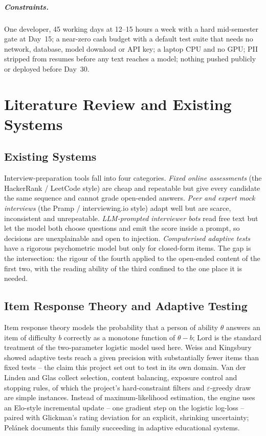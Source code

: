 \documentclass{tietreport}
\begin{document}
\paragraph{Constraints.} One developer, 45 working days at 12--15 hours a week with a hard
mid-semester gate at Day~15; a near-zero cash budget with a default test suite that needs no
network, database, model download or API key; a laptop CPU and no GPU; PII stripped from
resumes before any text reaches a model; nothing pushed publicly or deployed before Day~30.

\chapter{Literature Review and Existing Systems}
\label{ch:literature}

\section{Existing Systems}

Interview-preparation tools fall into four categories. \emph{Fixed online assessments} (the HackerRank / LeetCode style) are cheap and repeatable but give every candidate the same sequence and cannot grade open-ended answers. \emph{Peer and expert mock interviews} (the Pramp / interviewing.io style) adapt well but are scarce, inconsistent and unrepeatable. \emph{LLM-prompted interviewer bots} read free text but let the model both choose questions and emit the score inside a prompt, so decisions are unexplainable and open to injection. \emph{Computerised adaptive tests} have a rigorous psychometric model \cite{vanderlinden2000cat} but only for closed-form items. The gap is the intersection: the rigour of the fourth applied to the open-ended content of the first two, with the reading ability of the third confined to the one place it is needed.

\section{Item Response Theory and Adaptive Testing}

Item response theory models the probability that a person of ability $\theta$ answers an item
of difficulty $b$ correctly as a monotone function of $\theta-b$; Lord \cite{lord1980irt} is the
standard treatment of the two-parameter logistic model used here. Weiss and Kingsbury
\cite{weiss1984cat} showed adaptive tests reach a given precision with substantially fewer items
than fixed tests -- the claim this project set out to test in its own domain. Van der Linden and Glas \cite{vanderlinden2000cat} collect selection, content balancing, exposure control and stopping rules, of which the project's hard-constraint filters and $\varepsilon$-greedy draw are simple instances. Instead of maximum-likelihood estimation, the engine uses an Elo-style incremental update
\cite{elo1978rating} -- one gradient step on the logistic log-loss -- paired with Glickman's
rating deviation \cite{glickman1999glicko} for an explicit, shrinking uncertainty; Pel\'anek
\cite{pelanek2016elo} documents this family succeeding in adaptive educational systems.
\end{document}
